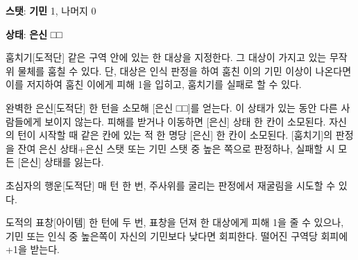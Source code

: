\documentclass{report}
\begin{document}
	\textbf{스탯}: \textbf{기민} 1, 나머지 0
	
	\textbf{상태}: \textbf{은신} □□
	
	\begin{story}{훔치기}{[도적단]}
		같은 구역 안에 있는 한 대상을 지정한다. 그 대상이 가지고 있는 무작위 물체를 훔칠 수 있다. 단, 대상은 인식 판정을 하여 훔친 이의 기민 이상이 나온다면 이를 저지하여 훔친 이에게 피해 1을 입히고, 훔치기를 실패로 할 수 있다.
	\end{story}
	
	\begin{story}{완벽한 은신}{[도적단]}
		한 턴을 소모해 [은신 □□]를 얻는다. 이 상태가 있는 동안 다른 사람들에게 보이지 않는다. 피해를 받거나 이동하면 [은신] 상태 한 칸이 소모된다. 자신의 턴이 시작할 때 같은 칸에 있는 적 한 명당 [은신] 한 칸이 소모된다. [훔치기]의 판정을 잔여 은신 상태+은신 스탯 또는 기민 스탯 중 높은 쪽으로 판정하나, 실패할 시 모든 [은신] 상태를 잃는다.
	\end{story}
	
	\begin{story}{초심자의 행운}{[도적단]}
		매 턴 한 번, 주사위를 굴리는 판정에서 재굴림을 시도할 수 있다.
	\end{story}
	
	\begin{story}{도적의 표창}{[아이템]}
		한 턴에 두 번, 표창을 던져 한 대상에게 피해 1을 줄 수 있으나, 기민 또는 인식 중 높은쪽이 자신의 기민보다 낮다면 회피한다. 떨어진 구역당 회피에 +1을 받는다.
	\end{story}
\end{document}
